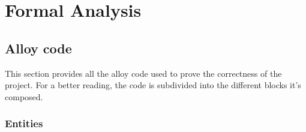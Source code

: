 \chapter{Formal Analysis} \label{alloy}

\section{Alloy code}

This section provides all the alloy code used to prove the correctness of the project. For a better reading, the code is subdivided into the different blocks it's composed.

\subsection{Entities}

